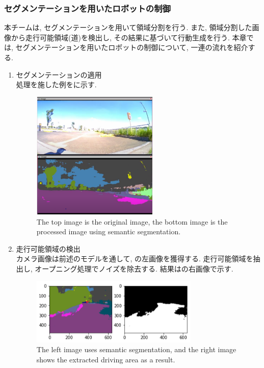 \documentclass[uplatex, twocolumn, 9pt]{jsproceedings}
\begin{document}

\subsubsection{セグメンテーションを用いたロボットの制御}
本チームは, セグメンテーションを用いて領域分割を行う. また, 領域分割した画像から走行可能領域(道)を検出し, その結果に基づいて行動生成を行う. 本章では, セグメンテーションを用いたロボットの制御について, 一連の流れを紹介する. 

\begin{enumerate}
  \item セグメンテーションの適用\\
  処理を施した例をに示す.
  \begin{figure}[h]
    \centering
    \includegraphics[width=60mm]{fig/camera_for_seg.pdf}
    \caption{The top image is the original image, the bottom image is the processed image using semantic segmentation.}
    \label{fig:for_seg}%
  \end{figure}
  \newpage
  \item 走行可能領域の検出\\
  カメラ画像は前述のモデルを通して, の左画像を獲得する. 走行可能領域を抽出し, オープニング処理でノイズを除去する. 結果はの右画像で示す.
  \begin{figure}[h]
    \centering
    \includegraphics[width=80mm]{fig/seg_runarea.pdf}
    \caption{The left image uses semantic segmentation, and the right image shows the extracted driving area as a result.}

\end{figure}
\end{enumerate}
\end{document}
